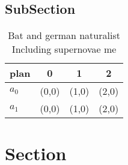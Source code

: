 \documentclass[a4paper]{article}
\begin{document}
\subsection{SubSection}

\begin{table}
\begin{adjustbox}{width=0.6\columnwidth}
\begin{tabular}{|l|l|l|l|}
\hline
\textbf{plan} & \multicolumn{1}{c|}{\textbf{0}} & \multicolumn{1}{c|}{\textbf{1}} & \multicolumn{1}{c|}{\textbf{2}} \\ \hline
\textbf{$a_0$}  & (0,0) & (1,0) & (2,0) \\ \hline
\textbf{$a_1$}  & (0,0) & (1,0) & (2,0) \\ \hline
\end{tabular}
\end{adjustbox}
\caption{Bat and german naturalist Including supernovae me
}
\end{table}

\section{Section}
\end{document}
